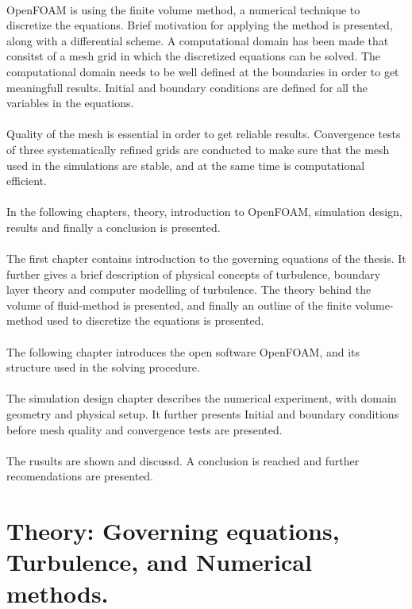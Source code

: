 \documentclass[a4paper, 12pt]{report}
\begin{document}
\\
OpenFOAM is using the finite volume method, a numerical technique to discretize the equations. Brief motivation for applying the method is presented, along with a differential scheme. A computational domain has been made that consitst of a mesh grid in which the discretized equations can be solved. The computational domain needs to be well defined at the boundaries in order to get meaningfull results. Initial and boundary conditions are defined for all the variables in the equations.\\
\\
Quality of the mesh is essential in order to get reliable results. Convergence tests of three systematically refined grids are conducted to make sure that the mesh used in the simulations are stable, and at the same time is computational efficient.\\
\\
In the following chapters, theory, introduction to OpenFOAM, simulation design, results and finally a conclusion is presented.\\
\\
The first chapter contains introduction to the governing equations of the thesis. It further gives a brief description of physical concepts of turbulence, boundary layer theory and computer modelling of turbulence. The theory behind the volume of fluid-method is presented, and finally an outline of the finite volume-method used to discretize the equations is presented.\\
\\
The following chapter introduces the open software OpenFOAM, and its structure used in the solving procedure.\\
\\
The simulation design chapter describes the numerical experiment, with domain geometry and physical setup. It further presents Initial and boundary conditions before mesh quality and convergence tests are presented.\\
\\
The rusults are shown and discussd. A conclusion is reached and further recomendations are presented.  
\chapter{Theory: Governing equations, Turbulence, and Numerical methods.}
\end{document}
